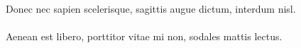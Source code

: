 \documentclass{article}
\begin{document}
Donec nec sapien scelerisque, sagittis augue dictum, interdum nisl. \\ \\ Aenean est libero, porttitor vitae mi non, sodales mattis lectus.
\end{document}
